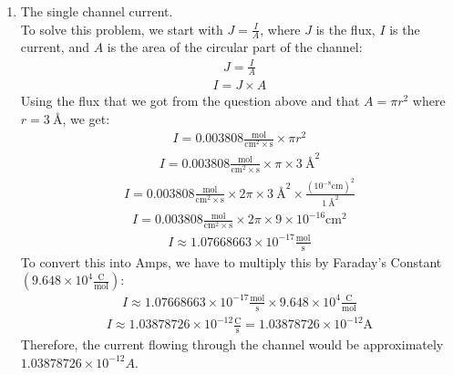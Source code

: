 \documentclass[11pt]{article}
\begin{document}
\begin{enumerate}[label=\arabic*.]
\begin{enumerate}[label=\Alph*.]
\begin{enumerate}[label=\arabic*.]
\vspace*{1\baselineskip}
\item
The single channel current.
\vspace*{1\baselineskip}
\\
To solve this problem, we start with $J = \frac{I} {A}$, where $J$ is the flux, $I$ is the current, and $A$ is the area of the circular part of the channel:
\begin{align*}
J = \frac{I} {A}
\end{align*}
\begin{align*}
I = J \times A
\end{align*}
Using the flux that we got from the question above and that $A = \pi r ^ 2$ where $r = \SI{3}{\angstrom}$, we get:
\begin{align*}
I =  0.003808 \frac{\text{mol}} {\text{cm} ^ {2} \times \text{s}} \times \pi r ^ 2
\end{align*}
\begin{align*}
I =  0.003808 \frac{\text{mol}} {\text{cm} ^ {2} \times \text{s}} \times \pi \times \SI{3}{\angstrom} ^ 2
\end{align*}
\begin{align*}
I =  0.003808 \frac{\text{mol}} {\text{cm} ^ {2} \times \text{s}} \times 2 \pi \times \SI{3}{\angstrom} ^ 2 \times \frac{\left(10 ^ {-8} \text{cm}\right) ^ 2} {\SI{1}{\angstrom} ^ 2}
\end{align*}
\begin{align*}
I =  0.003808 \frac{\text{mol}} {\text{cm} ^ {2} \times \text{s}} \times 2 \pi \times 9 \times 10 ^ {-16} \text{cm} ^ {2}
\end{align*}
\begin{align*}
I \approx 1.07668663 \times 10 ^ {-17} \frac{\text{mol}} {\text{s}}
\end{align*}
To convert this into Amps, we have to multiply this by Faraday's Constant $\left(9.648 \times 10 ^ 4 \frac{\text{C}} {\text{mol}}\right)$:
\begin{align*}
I \approx 1.07668663 \times 10 ^ {-17} \frac{\text{mol}} {\text{s}} \times 9.648 \times 10 ^ 4 \frac{\text{C}} {\text{mol}}
\end{align*}
\begin{align*}
I \approx 1.03878726 \times 10 ^ {-12} \frac{\text{C}} {\text{s}} = 1.03878726 \times 10 ^ {-12} \text{A}
\end{align*}
Therefore, the current flowing through the  channel would be approximately $1.03878726 \times 10 ^ {-12} A$.




\end{enumerate}
\end{enumerate}
\end{enumerate}
\end{document}
